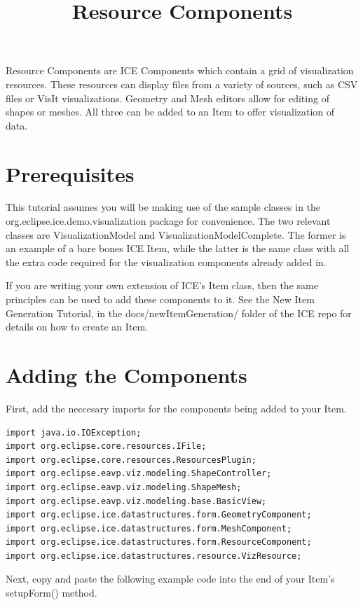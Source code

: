 
\title{Resource Components}
\maketitle{}

Resource Components are ICE Components which contain a grid of visualization
resources. These resources can display files from a variety of sources,
such as CSV files or VisIt visualizations. Geometry and Mesh editors allow for
editing of shapes or meshes. All three can be added to an Item to offer
visualization of data.

\section{Prerequisites}

This tutorial assumes you will be making use of the sample classes in the
org.eclipse.ice.demo.visualization package for convenience. The two relevant
classes are VisualizationModel and VisualizationModelComplete. The former is an
example of a bare bones ICE Item, while the latter is the same class with all
the extra code required for the visualization components already added in.

If you are writing your own extension of ICE's Item class, then the same
principles can be used to add these components to it. See the New Item
Generation Tutorial, in the docs/newItemGeneration/ folder of the ICE repo for
details on how to create an Item.

\section{Adding the Components}

First, add the neccesary imports for the components being added to your Item. 

\begin{verbatim}
import java.io.IOException;
import org.eclipse.core.resources.IFile;
import org.eclipse.core.resources.ResourcesPlugin;
import org.eclipse.eavp.viz.modeling.ShapeController;
import org.eclipse.eavp.viz.modeling.ShapeMesh;
import org.eclipse.eavp.viz.modeling.base.BasicView;
import org.eclipse.ice.datastructures.form.GeometryComponent;
import org.eclipse.ice.datastructures.form.MeshComponent;
import org.eclipse.ice.datastructures.form.ResourceComponent;
import org.eclipse.ice.datastructures.resource.VizResource;
\end{verbatim}

Next, copy and paste the following example code into the end of your Item's
setupForm() method.

